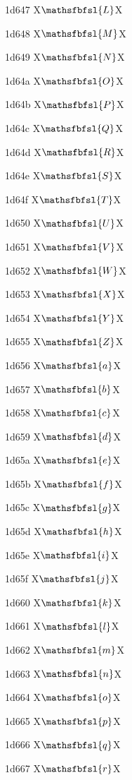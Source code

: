 \documentclass[11pt]{article}
\begin{document}
1d647 X{\ensuremath{\mathsfbfsl{L}}}X

1d648 X{\ensuremath{\mathsfbfsl{M}}}X

1d649 X{\ensuremath{\mathsfbfsl{N}}}X

1d64a X{\ensuremath{\mathsfbfsl{O}}}X

1d64b X{\ensuremath{\mathsfbfsl{P}}}X

1d64c X{\ensuremath{\mathsfbfsl{Q}}}X

1d64d X{\ensuremath{\mathsfbfsl{R}}}X

1d64e X{\ensuremath{\mathsfbfsl{S}}}X

1d64f X{\ensuremath{\mathsfbfsl{T}}}X

1d650 X{\ensuremath{\mathsfbfsl{U}}}X

1d651 X{\ensuremath{\mathsfbfsl{V}}}X

1d652 X{\ensuremath{\mathsfbfsl{W}}}X

1d653 X{\ensuremath{\mathsfbfsl{X}}}X

1d654 X{\ensuremath{\mathsfbfsl{Y}}}X

1d655 X{\ensuremath{\mathsfbfsl{Z}}}X

1d656 X{\ensuremath{\mathsfbfsl{a}}}X

1d657 X{\ensuremath{\mathsfbfsl{b}}}X

1d658 X{\ensuremath{\mathsfbfsl{c}}}X

1d659 X{\ensuremath{\mathsfbfsl{d}}}X

1d65a X{\ensuremath{\mathsfbfsl{e}}}X

1d65b X{\ensuremath{\mathsfbfsl{f}}}X

1d65c X{\ensuremath{\mathsfbfsl{g}}}X

1d65d X{\ensuremath{\mathsfbfsl{h}}}X

1d65e X{\ensuremath{\mathsfbfsl{i}}}X

1d65f X{\ensuremath{\mathsfbfsl{j}}}X

1d660 X{\ensuremath{\mathsfbfsl{k}}}X

1d661 X{\ensuremath{\mathsfbfsl{l}}}X

1d662 X{\ensuremath{\mathsfbfsl{m}}}X

1d663 X{\ensuremath{\mathsfbfsl{n}}}X

1d664 X{\ensuremath{\mathsfbfsl{o}}}X

1d665 X{\ensuremath{\mathsfbfsl{p}}}X

1d666 X{\ensuremath{\mathsfbfsl{q}}}X

1d667 X{\ensuremath{\mathsfbfsl{r}}}X
\end{document}
